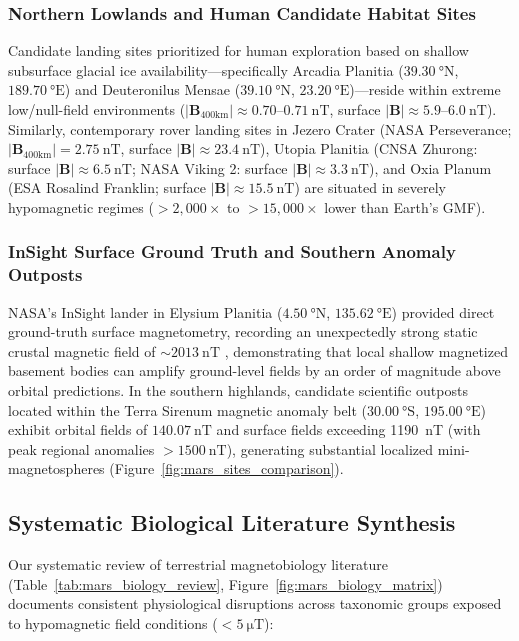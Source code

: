 \subsubsection{Northern Lowlands and Human Candidate Habitat Sites}
Candidate landing sites prioritized for human exploration based on shallow subsurface glacial ice availability—specifically Arcadia Planitia ($\SI{39.30}{\degree}\text{N}$, $\SI{189.70}{\degree}\text{E}$) and Deuteronilus Mensae ($\SI{39.10}{\degree}\text{N}$, $\SI{23.20}{\degree}\text{E}$)—reside within extreme low/null-field environments ($|\mathbf{B}_{\text{400km}}| \approx 0.70\text{--}\SI{0.71}{\nano\tesla}$, surface $|\mathbf{B}| \approx 5.9\text{--}\SI{6.0}{\nano\tesla}$). Similarly, contemporary rover landing sites in Jezero Crater (NASA Perseverance; $|\mathbf{B}_{\text{400km}}| = \SI{2.75}{\nano\tesla}$, surface $|\mathbf{B}| \approx \SI{23.4}{\nano\tesla}$), Utopia Planitia (CNSA Zhurong: surface $|\mathbf{B}| \approx \SI{6.5}{\nano\tesla}$; NASA Viking 2: surface $|\mathbf{B}| \approx \SI{3.3}{\nano\tesla}$), and Oxia Planum (ESA Rosalind Franklin; surface $|\mathbf{B}| \approx \SI{15.5}{\nano\tesla}$) are situated in severely hypomagnetic regimes ($>2,000\times$ to $>15,000\times$ lower than Earth's GMF).

\subsubsection{InSight Surface Ground Truth and Southern Anomaly Outposts}
NASA's InSight lander in Elysium Planitia ($\SI{4.50}{\degree}\text{N}$, $\SI{135.62}{\degree}\text{E}$) provided direct ground-truth surface magnetometry, recording an unexpectedly strong static crustal magnetic field of $\sim\SI{2013}{\nano\tesla}$ \citep{Johnson2020}, demonstrating that local shallow magnetized basement bodies can amplify ground-level fields by an order of magnitude above orbital predictions. In the southern highlands, candidate scientific outposts located within the Terra Sirenum magnetic anomaly belt ($\SI{30.00}{\degree}\text{S}$, $\SI{195.00}{\degree}\text{E}$) exhibit orbital fields of $\SI{140.07}{\nano\tesla}$ and surface fields exceeding \SI{1190}{\nano\tesla} (with peak regional anomalies $> \SI{1500}{\nano\tesla}$), generating substantial localized mini-magnetospheres (Figure~\ref{fig:mars_sites_comparison}).

\subsection{Systematic Biological Literature Synthesis}
Our systematic review of terrestrial magnetobiology literature (Table~\ref{tab:mars_biology_review}, Figure~\ref{fig:mars_biology_matrix}) documents consistent physiological disruptions across taxonomic groups exposed to hypomagnetic field conditions ($< \SI{5}{\micro\tesla}$):

